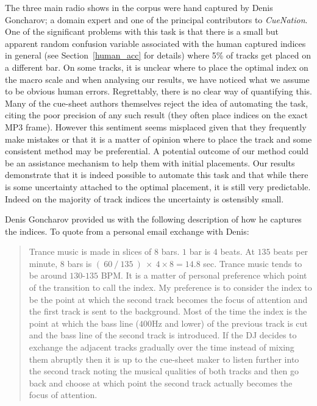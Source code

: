 \documentclass[twocolumn]{article}
\begin{document}
	The three main radio shows in the corpus were hand captured by Denis Goncharov; a domain expert and one of the principal contributors to \textit{CueNation}. One of the significant problems with this task is that there is a small but apparent random confusion variable associated with the human captured indices in general (see Section~\ref{human_acc} for details) where 5\% of tracks get placed on a different bar. On some tracks, it is unclear where to place the optimal index on the macro scale and when analysing our results, we have noticed what we assume to be obvious human errors. Regrettably, there is no clear way of quantifying this. Many of the cue-sheet authors themselves reject the idea of automating the task, citing the poor precision of any such result (they often place indices on the exact MP3 frame). However this sentiment seems misplaced given that they frequently make mistakes or that it is a matter of opinion where to place the track and some consistent method may be preferential. A potential outcome of our method could be an assistance mechanism to help them with initial placements. Our results demonstrate that it is indeed possible to automate this task and that while there is some uncertainty attached to the optimal placement, it is still very predictable. Indeed on the majority of track indices the uncertainty is ostensibly small. 
	
	Denis Goncharov provided us with the following description of how he captures the indices. To quote from a personal email exchange with Denis:
	
	\begin{quote}
		Trance music is made in slices of $8$ bars. $1$ bar is $4$ beats. At $135$ beats per minute, $8$ bars is $(~60~/~135~)~\times~4 \times 8 = 14.8$ sec. Trance music tends to be around $130$-$135$ BPM. It is a matter of personal preference which point of the transition to call the index. My preference is to consider the index to be the point at which the second track becomes the focus of attention and the first track is sent to the background. Most of the time the index is the point at which the bass line ($400$Hz and lower) of the previous track is cut and the bass line of the second track is introduced. If the DJ decides to exchange the adjacent tracks gradually over the time instead of mixing them abruptly then it is up to the cue-sheet maker to listen further into the second track noting the musical qualities of both tracks and then go back and choose at which point the second track actually becomes the focus of attention.
	\end{quote}
	
\end{document}
